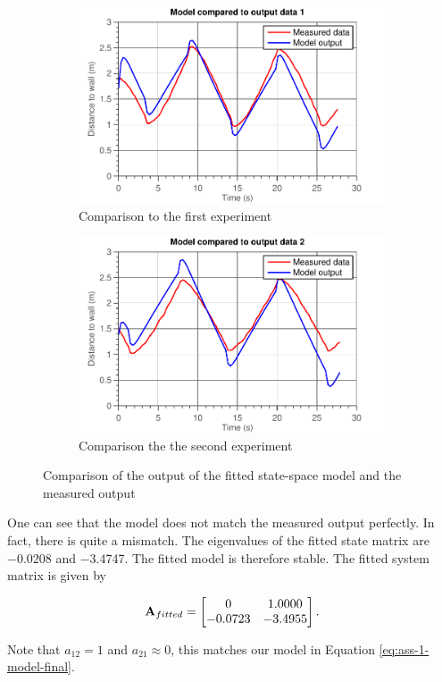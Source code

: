 \documentclass[11pt,titlepage]{report}
\begin{document}
\begin{figure}[H]
	\begin{subfigure}{.5\textwidth}
		\begin{center}
			\includegraphics[width=\linewidth]{resource/model-fit1.pdf}
		\end{center}
		\caption{Comparison to the first experiment}
	\end{subfigure}
	\begin{subfigure}{.5\textwidth}
		\begin{center}
			\includegraphics[width=\linewidth]{resource/model-fit2.pdf}
		\end{center}
		\caption{Comparison the the second experiment}
	\end{subfigure}
	\caption{Comparison of the output of the fitted state-space model and the measured output}
	\label{fig:ass-1-comp}
\end{figure}

One can see that the model does not match the measured output perfectly. In fact, there is quite a mismatch. The eigenvalues of the fitted state matrix are \num{-0.0208} and \num{-3.4747}. The fitted model is therefore stable. The fitted system matrix is given by

\begin{equation}
	\mathbf{A}_{fitted} = \begin{bmatrix}
	0 & 1.0000 \\
   -0.0723 & -3.4955	
	\end{bmatrix}.
\end{equation}

Note that $a_{12} = 1$ and $a_{21} \approx 0$, this matches our model in Equation \ref{eq:ass-1-model-final}.
\end{document}

